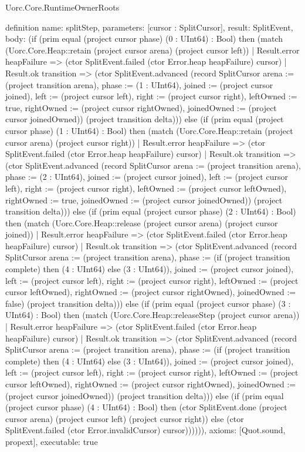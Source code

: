 \begin{lexlean}{Uorc.Core.RuntimeOwnerRoots}
\begin{semanticmodule}
definition{
  name: splitStep,
  parameters: [cursor : SplitCursor],
  result: SplitEvent,
  body: (if (prim equal (project cursor phase) (0 : UInt64) : Bool) then (match (Uorc.Core.Heap::retain (project cursor arena) (project cursor left))
    | Result.error heapFailure => (ctor SplitEvent.failed (ctor Error.heap heapFailure) cursor)
    | Result.ok transition => (ctor SplitEvent.advanced (record SplitCursor {arena := (project transition arena), phase := (1 : UInt64), joined := (project cursor joined), left := (project cursor left), right := (project cursor right), leftOwned := true, rightOwned := (project cursor rightOwned), joinedOwned := (project cursor joinedOwned)}) (project transition delta))) else (if (prim equal (project cursor phase) (1 : UInt64) : Bool) then (match (Uorc.Core.Heap::retain (project cursor arena) (project cursor right))
    | Result.error heapFailure => (ctor SplitEvent.failed (ctor Error.heap heapFailure) cursor)
    | Result.ok transition => (ctor SplitEvent.advanced (record SplitCursor {arena := (project transition arena), phase := (2 : UInt64), joined := (project cursor joined), left := (project cursor left), right := (project cursor right), leftOwned := (project cursor leftOwned), rightOwned := true, joinedOwned := (project cursor joinedOwned)}) (project transition delta))) else (if (prim equal (project cursor phase) (2 : UInt64) : Bool) then (match (Uorc.Core.Heap::release (project cursor arena) (project cursor joined))
    | Result.error heapFailure => (ctor SplitEvent.failed (ctor Error.heap heapFailure) cursor)
    | Result.ok transition => (ctor SplitEvent.advanced (record SplitCursor {arena := (project transition arena), phase := (if (project transition complete) then (4 : UInt64) else (3 : UInt64)), joined := (project cursor joined), left := (project cursor left), right := (project cursor right), leftOwned := (project cursor leftOwned), rightOwned := (project cursor rightOwned), joinedOwned := false}) (project transition delta))) else (if (prim equal (project cursor phase) (3 : UInt64) : Bool) then (match (Uorc.Core.Heap::releaseStep (project cursor arena))
    | Result.error heapFailure => (ctor SplitEvent.failed (ctor Error.heap heapFailure) cursor)
    | Result.ok transition => (ctor SplitEvent.advanced (record SplitCursor {arena := (project transition arena), phase := (if (project transition complete) then (4 : UInt64) else (3 : UInt64)), joined := (project cursor joined), left := (project cursor left), right := (project cursor right), leftOwned := (project cursor leftOwned), rightOwned := (project cursor rightOwned), joinedOwned := (project cursor joinedOwned)}) (project transition delta))) else (if (prim equal (project cursor phase) (4 : UInt64) : Bool) then (ctor SplitEvent.done (project cursor arena) (project cursor left) (project cursor right)) else (ctor SplitEvent.failed (ctor Error.invalidCursor) cursor)))))),
  axioms: [Quot.sound, propext],
  executable: true
}


\end{semanticmodule}
\end{lexlean}
